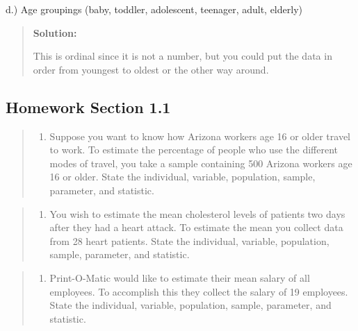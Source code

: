 \documentclass[]{book}
\providecommand{\tightlist}{%
  \setlength{\itemsep}{0pt}\setlength{\parskip}{0pt}}
\begin{document}
d.) Age groupings (baby, toddler, adolescent, teenager, adult, elderly)

\begin{quote}
\textbf{Solution:}

This is ordinal since it is not a number, but you could put the data in order from youngest to oldest or the other way around.
\end{quote}

\hypertarget{homework-section-1.1}{%
\subsection{Homework Section 1.1}\label{homework-section-1.1}}

\begin{quote}
\begin{enumerate}
\def\labelenumi{\arabic{enumi}.}
\tightlist
\item
  Suppose you want to know how Arizona workers age 16 or older travel to work. To estimate the percentage of people who use the different modes of travel, you take a sample containing 500 Arizona workers age 16 or older. State the individual, variable, population, sample, parameter, and statistic.
\end{enumerate}
\end{quote}

\begin{quote}
\begin{enumerate}
\def\labelenumi{\arabic{enumi}.}
\setcounter{enumi}{1}
\tightlist
\item
  You wish to estimate the mean cholesterol levels of patients two days after they had a heart attack. To estimate the mean you collect data from 28 heart patients. State the individual, variable, population, sample, parameter, and statistic.
\end{enumerate}
\end{quote}

\begin{quote}
\begin{enumerate}
\def\labelenumi{\arabic{enumi}.}
\setcounter{enumi}{2}
\tightlist
\item
  Print-O-Matic would like to estimate their mean salary of all employees. To accomplish this they collect the salary of 19 employees. State the individual, variable, population, sample, parameter, and statistic.
\end{enumerate}
\end{quote}
\end{document}
